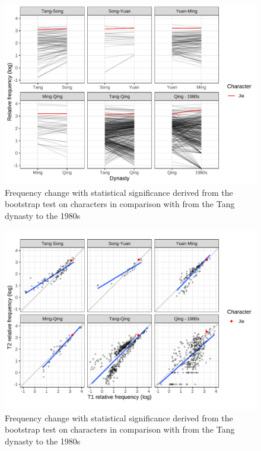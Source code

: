 \begin{figure}[H]
  \centering
  \includegraphics[height=0.4\textheight,keepaspectratio]{figures_new/char_freq/char_freq_change_lineplot.pdf}
  \caption{Frequency change with statistical significance derived from the bootstrap test on characters in comparison with \jia from the Tang dynasty to the 1980s}
  \label{fig:freq_boot_lineplot}
\end{figure}

\nopagebreak
\begin{figure}[H]
  \centering
  \includegraphics[height=0.4\textheight,keepaspectratio]{figures_new/char_freq/char_freq_change_lm.pdf}
  \caption{Frequency change with statistical significance derived from the bootstrap test on characters in comparison with \jia from the Tang dynasty to the 1980s}
  \label{fig:freq_boot_lm}
\end{figure}


